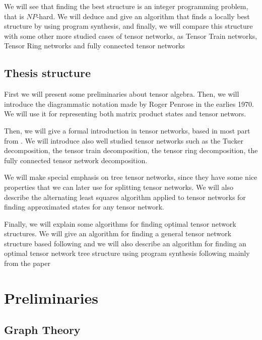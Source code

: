 \documentclass[11pt,a4paper,openright,oneside]{book}
\numberwithin{equation}{section}
\begin{document}
We will see that finding the best structure is an integer programming problem, that is $NP$-hard. We will deduce
and give an algorithm that finds a locally best structure by using program synthesis, and finally, we will compare this 
structure with some other more studied cases of tensor networks, as Tensor Train networks, Tensor Ring networks and
fully connected tensor networks


\section{Thesis structure}

First we will present some preliminaries about tensor algebra. Then, we will introduce the
diagrammatic notation made by Roger Penrose in the earlies 1970. We will
use it for representing both matrix product states and tensor networs.

Then, we will give a formal introduction in tensor networks, based in most part from \cite{yeTensorNetworkRanks2019}.
We will introduce also well studied tensor networks such as the Tucker decomposition, the tensor train decomposition, the tensor ring decomposition,
the fully connected tensor network decomposition.

We will make special emphasis on tree tensor networks, since they have some nice properties that we can later use
for splitting tensor networks. We will also describe the alternating least squares algorithm applied to tensor networks
for finding approximated states for any tensor network.

Finally, we will explain some algorithms for finding optimal tensor network structures. We will give an algorithm for
finding a general tensor network structure based following \cite{liPermutationSearchTensor2022} and we will also describe an algorithm for finding an 
optimal tensor network tree structure using program synthesis following mainly from the paper \cite{guoTensorNetworkStructure2025}



\chapter{Preliminaries}


\section{Graph Theory}
\end{document}
